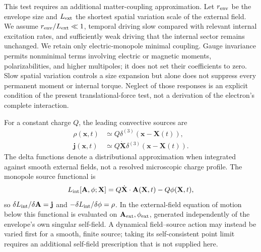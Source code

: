 \documentclass[11pt]{article}
\begin{document}
This test requires an additional matter-coupling approximation. Let $r_{\rm env}$ be the envelope size and $L_{\rm ext}$ the shortest spatial variation scale of the external field. We assume $r_{\rm env}/L_{\rm ext}\ll1$, temporal driving slow compared with relevant internal excitation rates, and sufficiently weak driving that the internal sector remains unchanged. We retain only electric-monopole minimal coupling. Gauge invariance permits nonminimal terms involving electric or magnetic moments, polarizabilities, and higher multipoles; it does not set their coefficients to zero. Slow spatial variation controls a size expansion but alone does not suppress every permanent moment or internal torque. Neglect of those responses is an explicit condition of the present translational-force test, not a derivation of the electron's complete interaction.

For a constant charge $Q$, the leading convective sources are
\begin{equation}
\begin{aligned}
\rho(\mathbf x,t)&\simeq Q\delta^{(3)}(\mathbf x-\mathbf X(t)),\\
\mathbf j(\mathbf x,t)&\simeq Q\dot{\mathbf X}\delta^{(3)}(\mathbf x-\mathbf X(t)).
\end{aligned}
\end{equation}
The delta functions denote a distributional approximation when integrated against smooth external fields, not a resolved microscopic charge profile. The monopole source functional is
\begin{equation}
L_{\rm int}[\mathbf A,\phi;\mathbf X]
=Q\dot{\mathbf X}\cdot\mathbf A(\mathbf X,t)-Q\phi(\mathbf X,t),
\end{equation}
so $\delta L_{\rm int}/\delta\mathbf A=\mathbf j$ and $-\delta L_{\rm int}/\delta\phi=\rho$. In the external-field equation of motion below this functional is evaluated on $\mathbf A_{\rm ext},\phi_{\rm ext}$, generated independently of the envelope's own singular self-field. A dynamical field--source action may instead be varied first for a smooth, finite source; taking its self-consistent point limit requires an additional self-field prescription that is not supplied here.
\end{document}
